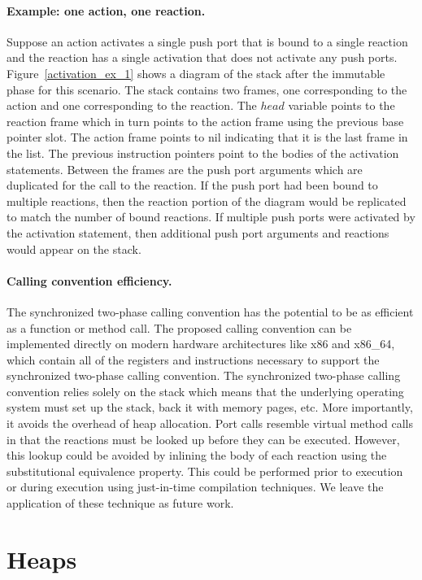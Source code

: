 \paragraph{Example:  one action, one reaction.}
Suppose an action activates a single push port that is bound to a single reaction and the reaction has a single activation that does not activate any push ports.
Figure~\ref{activation_ex_1} shows a diagram of the stack after the immutable phase for this scenario.
The stack contains two frames, one corresponding to the action and one corresponding to the reaction.
The $head$ variable points to the reaction frame which in turn points to the action frame using the previous base pointer slot.
The action frame points to nil indicating that it is the last frame in the list.
The previous instruction pointers point to the bodies of the activation statements.
Between the frames are the push port arguments which are duplicated for the call to the reaction.
If the push port had been bound to multiple reactions, then the reaction portion of the diagram would be replicated to match the number of bound reactions.
If multiple push ports were activated by the activation statement, then additional push port arguments and reactions would appear on the stack.

\paragraph{Calling convention efficiency.}
The synchronized two-phase calling convention has the potential to be as efficient as a function or method call.
The proposed calling convention can be implemented directly on modern hardware architectures like x86 and x86\_64, which contain all of the registers and instructions necessary to support the synchronized two-phase calling convention.
The synchronized two-phase calling convention relies solely on the stack which means that the underlying operating system must set up the stack, back it with memory pages, etc.
More importantly, it avoids the overhead of heap allocation.
Port calls resemble virtual method calls in that the reactions must be looked up before they can be executed.
However, this lookup could be avoided by inlining the body of each reaction using the substitutional equivalence property.
This could be performed prior to execution or during execution using just-in-time compilation techniques.
We leave the application of these technique as future work.

\section{Heaps}

